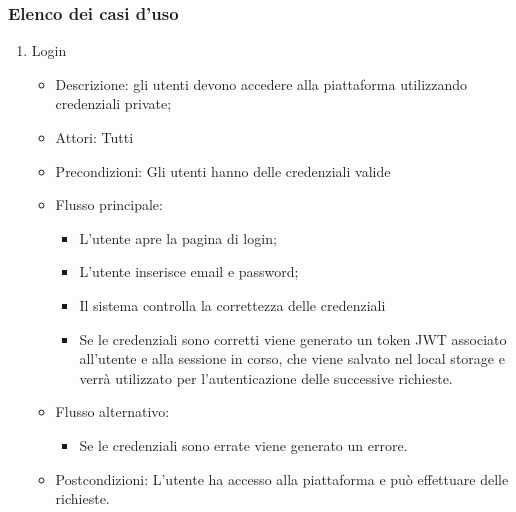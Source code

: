 \documentclass{article}
\begin{document}
\subsubsection{Elenco dei casi d'uso}
\begin{enumerate}
    \item Login 
    \begin{itemize}
        \item Descrizione: gli utenti devono accedere alla piattaforma utilizzando credenziali private;
        \item Attori: Tutti
        \item Precondizioni: Gli utenti hanno delle credenziali valide
        \item Flusso principale: 
            \begin{itemize}
                \item L'utente apre la pagina di login;
                \item L'utente inserisce email e password;
                \item Il sistema controlla la correttezza delle credenziali 
                \item Se le credenziali sono corretti viene generato un token JWT associato all'utente e alla sessione in corso, che viene salvato nel local storage e verrà utilizzato per l'autenticazione delle successive richieste.
            \end{itemize}
        \item Flusso alternativo: 
        \begin{itemize}
            \item Se le credenziali sono errate viene generato un errore.
        \end{itemize}
        \item Postcondizioni: L'utente ha accesso alla piattaforma e può effettuare delle richieste.
    \end{itemize}


\end{enumerate}
\end{document}
